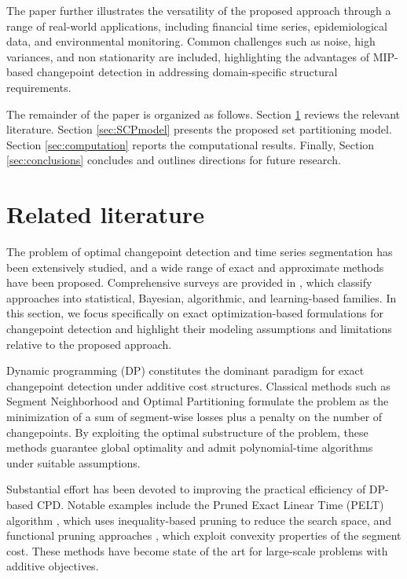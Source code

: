 \documentclass[preprints,article,submit,pdftex,moreauthors]{Definitions/mdpi}
\begin{document}
The paper further illustrates the versatility of the proposed approach through a range of real-world applications, including financial time series, epidemiological data, and environmental monitoring. Common challenges such as noise, high variances, and non stationarity are included, highlighting the advantages of MIP-based changepoint detection in addressing domain-specific structural requirements.

The remainder of the paper is organized as follows. Section \ref{sec:literature} reviews the relevant literature. Section \ref{sec:SCPmodel} presents the proposed set partitioning model. Section \ref{sec:computation} reports the computational results. Finally, Section \ref{sec:conclusions} concludes and outlines directions for future research.

\section{Related literature} 					\label{sec:literature}
The problem of optimal changepoint detection and time series segmentation has been extensively studied, and a wide range of exact and approximate methods have been proposed. Comprehensive surveys are provided in \cite{AC17,TOV20}, which classify approaches into statistical, Bayesian, algorithmic, and learning-based families. In this section, we focus specifically on exact optimization-based formulations for changepoint detection and highlight their modeling assumptions and limitations relative to the proposed approach.

Dynamic programming (DP) constitutes the dominant paradigm for exact changepoint detection under additive cost structures. Classical methods such as Segment Neighborhood \cite{AL89} and Optimal Partitioning \cite{JSB05} formulate the problem as the minimization of a sum of segment-wise losses plus a penalty on the number of changepoints. By exploiting the optimal substructure of the problem, these methods guarantee global optimality and admit polynomial-time algorithms under suitable assumptions.

Substantial effort has been devoted to improving the practical efficiency of DP-based CPD. Notable examples include the Pruned Exact Linear Time (PELT) algorithm \cite{KFE12}, which uses inequality-based pruning to reduce the search space, and functional pruning approaches \cite{R10,J13}, which exploit convexity properties of the segment cost. These methods have become state of the art for large-scale problems with additive objectives.
\end{document}
